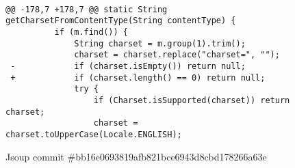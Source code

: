 \begin{figure*}
\begin{lstlisting}

@@ -178,7 +178,7 @@ static String getCharsetFromContentType(String contentType) {
          if (m.find()) {
              String charset = m.group(1).trim();
              charset = charset.replace("charset=", "");
 -            if (charset.isEmpty()) return null;
 +            if (charset.length() == 0) return null;
              try {
                  if (Charset.isSupported(charset)) return charset;
                  charset = charset.toUpperCase(Locale.ENGLISH);
\end{lstlisting}
\caption{Jsoup commit \#bb16e0693819afb821bce6943d8cbd178266a63e\label{fig:backward}}
\end{figure*}